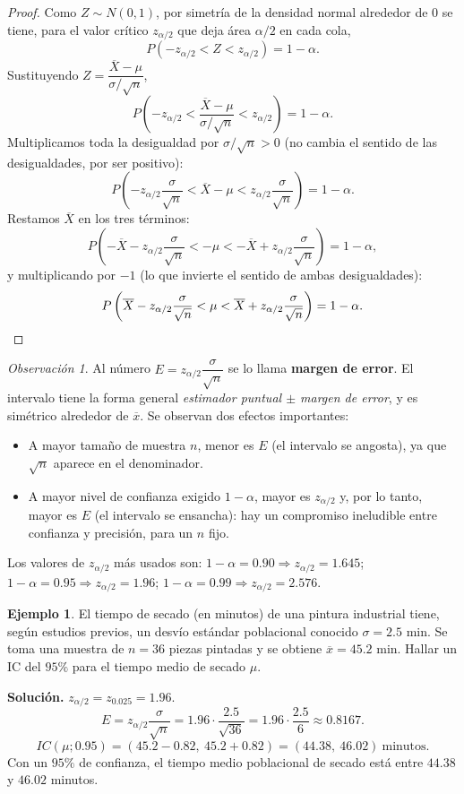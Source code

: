 \documentclass[11pt,a4paper]{article}
\theoremstyle{plain}
\theoremstyle{definition}
\newtheorem{ejemplo}[teorema]{Ejemplo}
\theoremstyle{remark}
\newtheorem{observacion}[teorema]{Observación}
\begin{document}
\begin{proof}
Como $Z\sim N(0,1)$, por simetría de la densidad normal alrededor de $0$ se tiene, para el valor crítico $z_{\alpha/2}$ que deja área $\alpha/2$ en cada cola,
\[
P(-z_{\alpha/2}<Z<z_{\alpha/2}) = 1-\alpha.
\]
Sustituyendo $Z=\dfrac{\overline X-\mu}{\sigma/\sqrt n}$,
\[
P\left(-z_{\alpha/2} < \frac{\overline X-\mu}{\sigma/\sqrt n} < z_{\alpha/2}\right) = 1-\alpha.
\]
Multiplicamos toda la desigualdad por $\sigma/\sqrt n>0$ (no cambia el sentido de las desigualdades, por ser positivo):
\[
P\left(-z_{\alpha/2}\frac{\sigma}{\sqrt n} < \overline X-\mu < z_{\alpha/2}\frac{\sigma}{\sqrt n}\right) = 1-\alpha.
\]
Restamos $\overline X$ en los tres términos:
\[
P\left(-\overline X-z_{\alpha/2}\frac{\sigma}{\sqrt n} < -\mu < -\overline X+z_{\alpha/2}\frac{\sigma}{\sqrt n}\right) = 1-\alpha,
\]
y multiplicando por $-1$ (lo que invierte el sentido de ambas desigualdades):
\[
P\left(\overline X - z_{\alpha/2}\frac{\sigma}{\sqrt n} < \mu < \overline X+z_{\alpha/2}\frac{\sigma}{\sqrt n}\right) = 1-\alpha. \qedhere
\]
\end{proof}

\begin{observacion}
Al número $E=z_{\alpha/2}\dfrac{\sigma}{\sqrt n}$ se lo llama \textbf{margen de error}. El intervalo tiene la forma general \emph{estimador puntual $\pm$ margen de error}, y es simétrico alrededor de $\overline x$. Se observan dos efectos importantes:
\begin{itemize}
\item A mayor tamaño de muestra $n$, menor es $E$ (el intervalo se angosta), ya que $\sqrt n$ aparece en el denominador.
\item A mayor nivel de confianza exigido $1-\alpha$, mayor es $z_{\alpha/2}$ y, por lo tanto, mayor es $E$ (el intervalo se ensancha): hay un compromiso ineludible entre confianza y precisión, para un $n$ fijo.
\end{itemize}
Los valores de $z_{\alpha/2}$ más usados son: $1-\alpha=0.90\Rightarrow z_{\alpha/2}=1.645$; $1-\alpha=0.95\Rightarrow z_{\alpha/2}=1.96$; $1-\alpha=0.99\Rightarrow z_{\alpha/2}=2.576$.
\end{observacion}

\begin{ejemplo}
El tiempo de secado (en minutos) de una pintura industrial tiene, según estudios previos, un desvío estándar poblacional conocido $\sigma=2.5$ min. Se toma una muestra de $n=36$ piezas pintadas y se obtiene $\overline x=45.2$ min. Hallar un IC del $95\%$ para el tiempo medio de secado $\mu$.

\textbf{Solución.} $z_{\alpha/2}=z_{0.025}=1.96$.
\[
E = z_{\alpha/2}\frac{\sigma}{\sqrt n} = 1.96\cdot\frac{2.5}{\sqrt{36}} = 1.96\cdot\frac{2.5}{6} \approx 0.8167.
\]
\[
IC(\mu;0.95) = (45.2-0.82,\ 45.2+0.82) = (44.38,\ 46.02)\ \text{minutos.}
\]
Con un $95\%$ de confianza, el tiempo medio poblacional de secado está entre $44.38$ y $46.02$ minutos.
\end{ejemplo}
\end{document}
